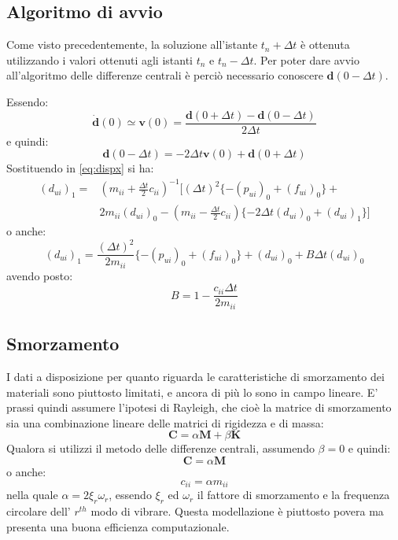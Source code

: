 \subsection{Algoritmo di avvio}
Come visto precedentemente, la soluzione all'istante $t_n + \varDelta t$ è ottenuta utilizzando i valori ottenuti agli istanti $t_n$ e $t_n - \varDelta t$. Per poter dare avvio all'algoritmo delle differenze centrali è perciò necessario conoscere $\boldsymbol{d}(0-\varDelta t)$.

Essendo:
\begin{equation}
	 \boldsymbol{\dot{d}}(0) \simeq \boldsymbol{v}(0) = \frac{\boldsymbol{d}(0 + \varDelta t) - \boldsymbol{d}(0 - \varDelta t)}{2 \varDelta t}
\end{equation}
e quindi:
\begin{equation}
	\boldsymbol{d}(0 - \varDelta t) = -2\varDelta t \boldsymbol{v}(0) + \boldsymbol{d}(0 + \varDelta t)
\end{equation}
Sostituendo in \ref{eq:dispx} si ha:
\begin{equation} 
	\begin{split}
		(d_{ui})_1 = & (m_{ii} + \frac{\varDelta t}{2} c_{ii})^{-1} [(\varDelta t)^2 \{ - (p_{ui})_0 + (f_{ui})_0 \} + \\ 
		&2 m_{ii} (d_{ui})_0 - (m_{ii} - \frac{\varDelta t}{2} c_{ii}) \{-2 \varDelta t (d_{ui})_0 + (d_{ui})_1 \} ]
	\end{split} 
\end{equation}
o anche:
\begin{equation}
		(d_{ui})_1 = \frac{(\varDelta t)^2}{2 m_{ii}} \{ -(p_{ui})_0 + (f_{ui})_0 \} + (d_{ui})_0 + B\varDelta t (d_{ui})_0
\end{equation}
avendo posto:
\begin{equation*}
	B = 1- \frac{c_{ii}\varDelta t}{2m_{ii}}
\end{equation*}

\subsection{Smorzamento}
I dati a disposizione per quanto riguarda le caratteristiche di smorzamento dei materiali sono piuttosto limitati, e ancora di più lo sono in campo lineare. E' prassi quindi assumere l'ipotesi di Rayleigh, che cioè la matrice di smorzamento sia una combinazione lineare delle matrici di rigidezza e di massa:
\begin{equation}
	\boldsymbol{C} = \alpha \boldsymbol{M} + \beta \boldsymbol{K}
\end{equation}
Qualora si utilizzi il metodo delle differenze centrali, assumendo $\beta = 0$ e quindi:
\begin{equation}
	\boldsymbol{C} = \alpha \boldsymbol{M}
\end{equation}
o anche:
\begin{equation*}
	c_{ii} = \alpha m_{ii}
\end{equation*}
nella quale $\alpha = 2 \xi_{r} \omega_{r} $, essendo $\xi_{r}$ ed $\omega_{r}$ il fattore di smorzamento e la frequenza circolare dell' $r^{th}$ modo di vibrare. Questa modellazione è piuttosto povera ma presenta una buona efficienza computazionale.

